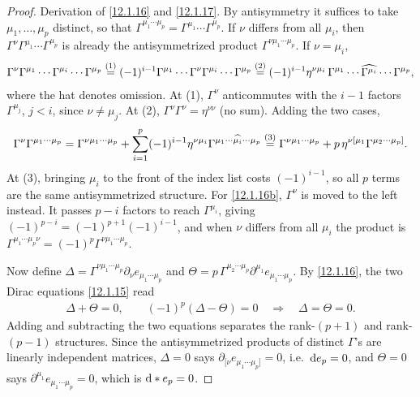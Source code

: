 \begin{tcolorbox}[breakable]
	\begin{proof}
		Derivation of \eqref{12.1.16} and \eqref{12.1.17}. By antisymmetry it suffices to take $\mu_{1},\dots,\mu_{p}$ distinct, so that $\Gamma^{\mu_{1}\cdots\mu_{p}}=\Gamma^{\mu_{1}}\cdots\Gamma^{\mu_{p}}$. If $\nu$ differs from all $\mu_{i}$, then $\Gamma^{\nu}\Gamma^{\mu_{1}}\cdots\Gamma^{\mu_{p}}$ is already the antisymmetrized product $\Gamma^{\nu\mu_{1}\cdots\mu_{p}}$. If $\nu=\mu_{i}$,
		\begin{align*}
			\Gamma^{\nu}\Gamma^{\mu_{1}}\cdots\Gamma^{\mu_{i}}\cdots\Gamma^{\mu_{p}}
			\overset{(1)}{=} (-1)^{i-1}\Gamma^{\mu_{1}}\cdots\Gamma^{\nu}\Gamma^{\mu_{i}}\cdots\Gamma^{\mu_{p}}
			\overset{(2)}{=} (-1)^{i-1}\eta^{\nu\mu_{i}}\,\Gamma^{\mu_{1}}\cdots\widehat{\Gamma^{\mu_{i}}}\cdots\Gamma^{\mu_{p}} ,
		\end{align*}
		where the hat denotes omission. At (1), $\Gamma^{\nu}$ anticommutes with the $i-1$ factors $\Gamma^{\mu_{j}}$, $j<i$, since $\nu\ne\mu_{j}$. At (2), $\Gamma^{\nu}\Gamma^{\nu}=\eta^{\nu\nu}$ (no sum). Adding the two cases,
		\begin{align*}
			\Gamma^{\nu}\Gamma^{\mu_{1}\cdots\mu_{p}}
			=\Gamma^{\nu\mu_{1}\cdots\mu_{p}}+\sum_{i=1}^{p}(-1)^{i-1}\eta^{\nu\mu_{i}}\Gamma^{\mu_{1}\cdots\widehat{\mu_{i}}\cdots\mu_{p}}
			\overset{(3)}{=} \Gamma^{\nu\mu_{1}\cdots\mu_{p}}+p\,\eta^{\nu[\mu_{1}}\Gamma^{\mu_{2}\cdots\mu_{p}]} .
		\end{align*}
		At (3), bringing $\mu_{i}$ to the front of the index list costs $(-1)^{i-1}$, so all $p$ terms are the same antisymmetrized structure. For \eqref{12.1.16b}, $\Gamma^{\nu}$ is moved to the left instead. It passes $p-i$ factors to reach $\Gamma^{\mu_{i}}$, giving $(-1)^{p-i}=(-1)^{p+1}(-1)^{i-1}$, and when $\nu$ differs from all $\mu_{i}$ the product is $\Gamma^{\mu_{1}\cdots\mu_{p}\nu}=(-1)^{p}\Gamma^{\nu\mu_{1}\cdots\mu_{p}}$.

		Now define $\Delta=\Gamma^{\nu\mu_{1}\cdots\mu_{p}}\partial_{\nu}e_{\mu_{1}\cdots\mu_{p}}$ and $\Theta=p\,\Gamma^{\mu_{2}\cdots\mu_{p}}\partial^{\mu_{1}}e_{\mu_{1}\cdots\mu_{p}}$. By \eqref{12.1.16}, the two Dirac equations \eqref{12.1.15} read
		\begin{align*}
			\Delta+\Theta=0,\qquad (-1)^{p}(\Delta-\Theta)=0
			\quad\Longrightarrow\quad \Delta=\Theta=0 .
		\end{align*}
		Adding and subtracting the two equations separates the rank-$(p+1)$ and rank-$(p-1)$ structures. Since the antisymmetrized products of distinct $\Gamma$'s are linearly independent matrices, $\Delta=0$ says $\partial_{[\nu}e_{\mu_{1}\cdots\mu_{p}]}=0$, i.e.\ $\mathrm{d} e_{p}=0$, and $\Theta=0$ says $\partial^{\mu_{1}}e_{\mu_{1}\cdots\mu_{p}}=0$, which is $\mathrm{d}\ast e_{p}=0$.
	\end{proof}
\end{tcolorbox}

